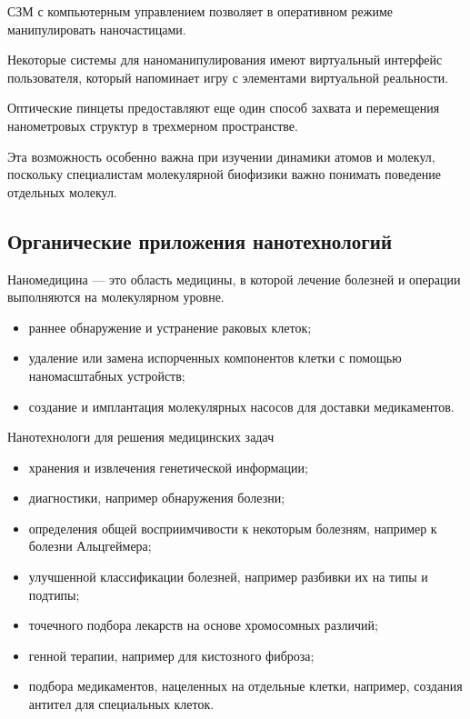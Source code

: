 \documentclass[_Venture_p3.tex]{subfiles}
\begin{document}
\begin{frame}
СЗМ с компьютерным управлением позволяет в оперативном режиме манипулировать наночастицами. 

Некоторые системы для наноманипулирования имеют виртуальный интерфейс пользователя, который напоминает игру с элементами виртуальной реальности.
\end{frame}

\begin{frame}{Оптические пинцеты }
предоставляют еще один способ захвата и перемещения нанометровых структур в трехмерном пространстве. 

Эта возможность особенно важна при изучении динамики атомов и молекул, поскольку специалистам молекулярной биофизики важно понимать поведение отдельных молекул.

\end{frame}

\subsection{Органические приложения нанотехнологий}
\begin{frame}
\begin{block}{Наномедицина}
	\quad — это область медицины, в которой лечение болезней и операции выполняются на молекулярном уровне.
\end{block}
\begin{itemize}
	\item раннее обнаружение и устранение раковых клеток;
	\item удаление или замена испорченных компонентов клетки с помощью наномасштабных устройств;
	\item создание и имплантация молекулярных насосов для доставки медикаментов.
\end{itemize}
\end{frame}

\begin{frame}[allowframebreaks]{Нанотехнологи для решения медицинских задач}
\begin{itemize}
	\item хранения и извлечения генетической информации;
	\item диагностики, например обнаружения болезни;
	\item определения общей восприимчивости к некоторым болезням, например к болезни Альцгеймера;
	\item улучшенной классификации болезней, например разбивки их на типы и подтипы;
	
	\pagebreak
	\item точечного подбора лекарств на основе хромосомных различий;
	\item генной терапии, например для кистозного фиброза;
	\item подбора медикаментов, нацеленных на отдельные клетки, например, создания антител для специальных клеток.
\end{itemize}
\end{frame}
\end{document}
